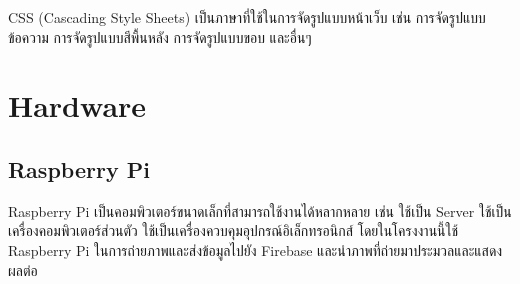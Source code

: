 CSS (Cascading Style Sheets) เป็นภาษาที่ใช้ในการจัดรูปแบบหน้าเว็บ เช่น การจัดรูปแบบข้อความ การจัดรูปแบบสีพื้นหลัง การจัดรูปแบบขอบ และอื่นๆ \cite{website:css}

\section{Hardware}

\subsection{Raspberry Pi}

Raspberry Pi เป็นคอมพิวเตอร์ขนาดเล็กที่สามารถใช้งานได้หลากหลาย เช่น ใช้เป็น Server ใช้เป็นเครื่องคอมพิวเตอร์ส่วนตัว ใช้เป็นเครื่องควบคุมอุปกรณ์อิเล็กทรอนิกส์
\enskip โดยในโครงงานนี้ใช้ Raspberry Pi ในการถ่ายภาพและส่งข้อมูลไปยัง Firebase และนำภาพที่ถ่ายมาประมวลและแสดงผลต่อ \cite{website:raspberrypi}









